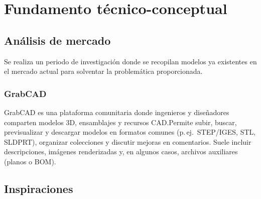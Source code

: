 \section{Fundamento técnico-conceptual}

\subsection{Análisis de mercado}
Se realiza un periodo de investigación donde se recopilan modelos ya existentes en el mercado actual para solventar la problemática proporcionada.


\subsubsection{GrabCAD}
GrabCAD es una plataforma comunitaria donde ingenieros y diseñadores comparten modelos 3D, ensamblajes y recursos CAD.\@ Permite subir, buscar, previsualizar y descargar modelos en formatos comunes (p.\,ej.\ STEP/IGES, STL, SLDPRT), organizar colecciones y discutir mejoras en comentarios. Suele incluir descripciones, imágenes renderizadas y, en algunos casos, archivos auxiliares (planos o BOM).

\newpage

\subsection{Inspiraciones}

